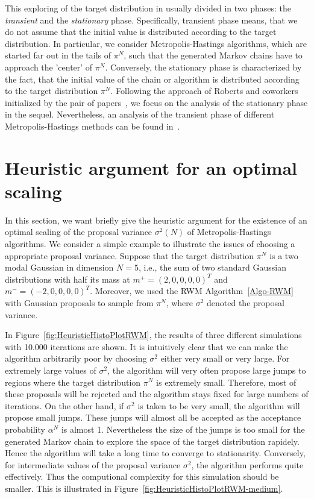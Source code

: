 This exploring of the target distribution in usually divided in two phases: the \textit{transient} and the \textit{stationary} phase. Specifically, transient phase means, that we do not assume that the initial value is distributed according to the target distribution. In particular, we consider Metropolis-Hastings algorithms, which are started far out in the tails of $ \pi^{N} $, such that the generated Markov chains have to approach the 'center' of $ \pi^{N} $. Conversely, the stationary phase is characterized by the fact, that the initial value of the chain or algorithm is distributed according to the target distribution $ \pi^{N} $. Following the approach of Roberts and coworkers initialized by the pair of papers~\autocite{Roberts1997, Roberts2001}, we focus on the analysis of the stationary phase in the sequel. Nevertheless, an analysis of the transient phase of different Metropolis-Hastings methods can be found in~\autocite{Christensen2003, Jourdain2013}.


\section{Heuristic argument for an optimal scaling}
\label{CC:Heuristics}

In this section, we want briefly give the heuristic argument for the existence of an optimal scaling of the proposal variance $ \sigma^2 (N) $ of Metropolis-Hastings algorithms.
We consider a simple example to illustrate the issues of choosing a appropriate proposal variance. Suppose that the target distribution $ \pi^{N} $ is a two modal Gaussian in dimension $N=5$, i.e., the sum of two standard Gaussian distributions with half its mass at $ m^+ = (2,0,0,0,0)^T $ and  $ m^- = (-2,0,0,0,0)^T $. Moreover, we used the RWM Algorithm~\ref{Algo-RWM} with Gaussian proposals to sample from $ \pi^{N} $, where $ \sigma^2 $ denoted the proposal variance.

In Figure~\ref{fig:HeuristicHistoPlotRWM}, the results of three different simulations with 10.000 iterations are shown. It is intuitively clear that we can make the algorithm arbitrarily poor by choosing $ \sigma^2 $ either very small or very large. For extremely large values of $ \sigma^2 $, the algorithm will very often propose large jumps to regions where the target distribution $ \pi^{N} $ is extremely small. Therefore, most of these proposals will be rejected and the algorithm stays fixed for large numbers of iterations. On the other hand, if $\sigma^2$ is taken to be very small, the algorithm will propose small jumps. These jumps will almost all be accepted as the acceptance probability $ \alpha^{N} $ is almost 1. Nevertheless the size of the jumps is too small for the generated Markov chain to explore the space of the target distribution rapidely. Hence the algorithm will take a long time to converge to stationarity. Conversely, for intermediate values of the proposal variance $\sigma^2$, the algorithm performs quite effectively. Thus the computional complexity for this simulation should be smaller. This is illustrated in Figure~\ref{fig:HeuristicHistoPlotRWM-medium}.

